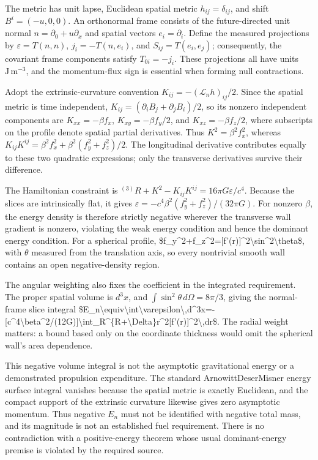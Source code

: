 \documentclass[11pt]{article}
\begin{document}
The metric has unit lapse, Euclidean spatial metric $h_{ij}=\delta_{ij}$, and shift $B^i=(-u,0,0)$. An orthonormal frame consists of the future-directed unit normal $n=\partial_0+u\partial_x$ and spatial vectors $e_i=\partial_i$. Define the measured projections by $\varepsilon=T(n,n)$, $j_i=-T(n,e_i)$, and $S_{ij}=T(e_i,e_j)$; consequently, the covariant frame components satisfy $T_{0i}=-j_i$. These projections all have units $\mathrm{J\,m^{-3}}$, and the momentum-flux sign is essential when forming null contractions.

Adopt the extrinsic-curvature convention $K_{ij}=-(\mathcal L_n h)_{ij}/2$. Since the spatial metric is time independent, $K_{ij}=(\partial_i B_j+\partial_j B_i)/2$, so its nonzero independent components are $K_{xx}=-\beta f_x$, $K_{xy}=-\beta f_y/2$, and $K_{xz}=-\beta f_z/2$, where subscripts on the profile denote spatial partial derivatives. Thus $K^2=\beta^2 f_x^2$, whereas $K_{ij}K^{ij}=\beta^2 f_x^2+\beta^2(f_y^2+f_z^2)/2$. The longitudinal derivative contributes equally to these two quadratic expressions; only the transverse derivatives survive their difference.

The Hamiltonian constraint is ${}^{(3)}R+K^2-K_{ij}K^{ij}=16\pi G\varepsilon/c^4$. Because the slices are intrinsically flat, it gives $\varepsilon=-c^4\beta^2(f_y^2+f_z^2)/(32\pi G)$. For nonzero $\beta$, the energy density is therefore strictly negative wherever the transverse wall gradient is nonzero, violating the weak energy condition and hence the dominant energy condition. For a spherical profile, \$f\_y\textasciicircum{}2+f\_z\textasciicircum{}2=[f'(r)]\textasciicircum{}2\textbackslash{}sin\textasciicircum{}2\textbackslash{}theta\$, with $\theta$ measured from the translation axis, so every nontrivial smooth wall contains an open negative-density region.

The angular weighting also fixes the coefficient in the integrated requirement. The proper spatial volume is $d^3x$, and $\int\sin^2\theta\,d\Omega=8\pi/3$, giving the normal-frame slice integral \$E\_n\textbackslash{}equiv\textbackslash{}int\textbackslash{}varepsilon\textbackslash{},d\textasciicircum{}3x=-[c\textasciicircum{}4\textbackslash{}beta\textasciicircum{}2/(12G)]\textbackslash{}int\_R\textasciicircum{}\{R+\textbackslash{}Delta\}r\textasciicircum{}2[f'(r)]\textasciicircum{}2\textbackslash{},dr\$. The radial weight matters: a bound based only on the coordinate thickness would omit the spherical wall\textquoteright{}s area dependence.

This negative volume integral is not the asymptotic gravitational energy or a demonstrated propulsion expenditure. The standard Arnowitt\textendash{}Deser\textendash{}Misner energy surface integral vanishes because the spatial metric is exactly Euclidean, and the compact support of the extrinsic curvature likewise gives zero asymptotic momentum. Thus negative $E_n$ must not be identified with negative total mass, and its magnitude is not an established fuel requirement. There is no contradiction with a positive-energy theorem whose usual dominant-energy premise is violated by the required source.
\end{document}
